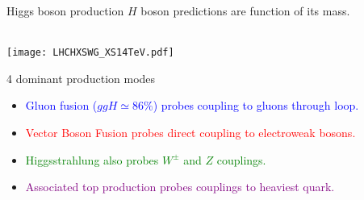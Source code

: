 \begin{frame}{Higgs boson production}
  $H$ boson predictions are function of its mass.
  
  \begin{minipage}{0.44\linewidth}
    \centering
    \\
    \texttt{[image: LHCHXSWG\_XS14TeV.pdf]}
  \end{minipage}
  \hfill
  \begin{minipage}{0.55\linewidth}
    4 dominant production modes
    \begin{itemize}
    \item \textcolor{blue}{Gluon fusion ($ggH\simeq 86\%$) probes coupling to gluons through loop.}
    \item \textcolor{red}{Vector Boson Fusion probes direct coupling to electroweak bosons.}
    \item \textcolor{green}{Higgsstrahlung also probes $W^\pm$ and $Z$ couplings.}
    \item \textcolor{purple}{Associated top production probes couplings to heaviest quark.}
    \end{itemize}
  \end{minipage}
\end{frame}


